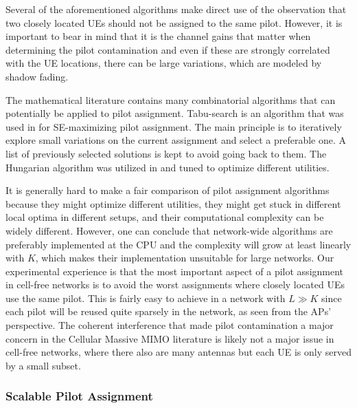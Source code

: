 Several of the aforementioned algorithms make direct use of the observation that two closely located UEs should not be assigned to the same pilot. However, it is important to bear in mind that it is the channel gains that matter when determining the pilot contamination and even if these are strongly correlated with the UE locations, there can be large variations, which are modeled by shadow fading. 

The mathematical literature contains many combinatorial algorithms that can potentially be applied to pilot assignment. Tabu-search is an algorithm that was used in \cite{Liu2020a} for SE-maximizing pilot assignment. The main principle is to iteratively explore small variations on the current assignment and select a preferable one. A list of previously selected solutions is kept to avoid going back to them. The Hungarian algorithm was utilized in \cite{Buzzi2020a} and tuned to optimize different utilities.

\enlargethispage{1.2\baselineskip}

It is generally hard to make a fair comparison of pilot assignment algorithms because they might  optimize different utilities, they might get stuck in different local optima in different setups, and their computational complexity can be widely different. However, one can conclude that network-wide algorithms are preferably implemented at the CPU and the complexity will grow at least linearly with $K$, which makes their implementation unsuitable for large networks. Our experimental experience is that the most important aspect of a pilot assignment in cell-free networks is to avoid the worst assignments where closely located UEs use the same pilot. This is fairly easy to achieve in a network with $L \gg K$ since each pilot will be reused quite sparsely in the network, as seen from the APs' perspective. The coherent interference that made pilot contamination a major concern in the Cellular Massive MIMO literature is likely not a major issue in cell-free networks, where there also are many antennas but each UE is only served by a small subset.

\enlargethispage{\baselineskip}



\subsubsection{Scalable Pilot Assignment}



